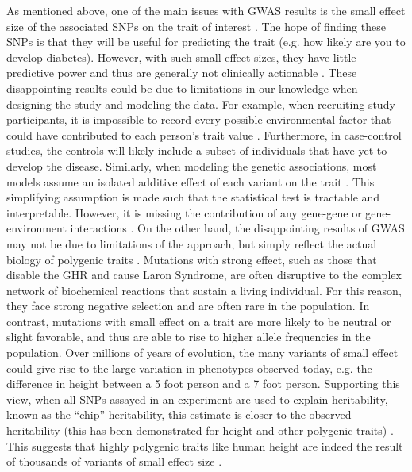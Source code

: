 As mentioned above, one of the main issues with GWAS results is the
small effect size of the associated SNPs on the trait of interest \citep{Manolio2009}. The
hope of finding these SNPs is that they will be useful for predicting
the trait (e.g. how likely are you to develop diabetes). However, with
such small effect sizes, they have little predictive power and thus
are generally not clinically actionable \citep{Torres2013, Wray2013}. These disappointing results
could be due to limitations in our knowledge when designing the study
and modeling the data. For example, when recruiting study
participants, it is impossible to record every possible environmental
factor that could have contributed to each person’s trait
value \citep{Ober2011}. Furthermore, in case-control studies, the controls will likely
include a subset of individuals that have yet to develop the
disease. Similarly, when modeling the genetic associations, most
models assume an isolated additive effect of each variant on the
trait \citep{Cordell2009}. This simplifying assumption is made such that the statistical
test is tractable and interpretable. However, it is missing the
contribution of any gene-gene or gene-environment interactions
\citep{Cordell2009, Thomas2010, Lappalainen2011, Ackermann2012, Huang2012, Starr2016}. On the
other hand, the disappointing results of GWAS may not be due to
limitations of the approach, but simply reflect the actual biology of
polygenic traits \citep{DiRienzo2006, Bodmer2008, Schork2009, Pritchard2010}.
Mutations with strong effect, such as those that
disable the GHR and cause Laron Syndrome, are often disruptive to the
complex network of biochemical reactions that sustain a living
individual. For this reason, they face strong negative selection and
are often rare in the population. In contrast, mutations with small
effect on a trait are more likely to be neutral or slight favorable,
and thus are able to rise to higher allele frequencies in the
population. Over millions of years of evolution, the many variants of
small effect could give rise to the large variation in phenotypes
observed today, e.g. the difference in height between a 5 foot person
and a 7 foot person. Supporting this view, when all SNPs assayed in an
experiment are used to explain heritability, known as the “chip”
heritability, this estimate is closer to the observed
heritability (this has been demonstrated for height and other polygenic traits) \citep{Yang2010, Lee2011}. This suggests that highly polygenic traits like human
height are indeed the result of thousands of variants of small effect
size \citep{Wood2014}.

